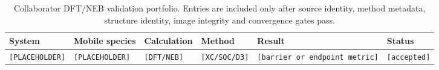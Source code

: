 \begin{table}[ht]
\centering
\caption{Collaborator DFT/NEB validation portfolio. Entries are included only
after source identity, method metadata, structure identity, image integrity and
convergence gates pass.}
\label{tab:collaborator-dft-neb-validation}
\begin{tabular}{llllll}
\hline
System & Mobile species & Calculation & Method & Result & Status \\
\hline
\texttt{[PLACEHOLDER]} & \texttt{[PLACEHOLDER]} & \texttt{[DFT/NEB]} &
\texttt{[XC/SOC/D3]} & \texttt{[barrier or endpoint metric]} & \texttt{[accepted]} \\
\hline
\end{tabular}
\end{table}
